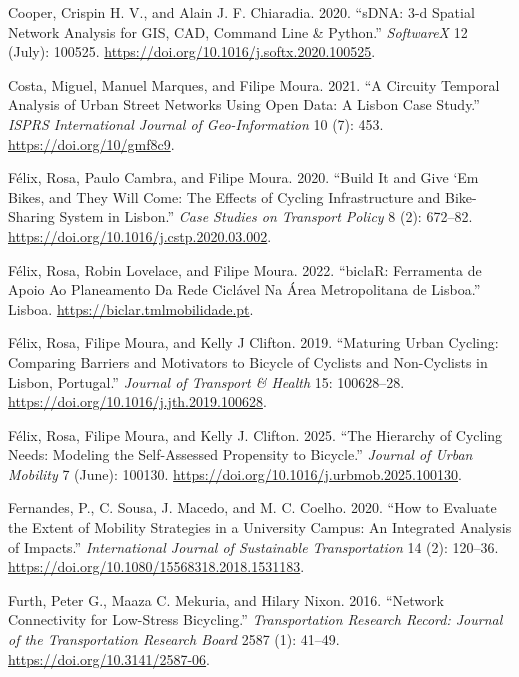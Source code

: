 \documentclass[
  sn-nature,
]{sn-jnl}
\newlength{\cslhangindent}
\newenvironment{CSLReferences}[2] %
 {\begin{list}{}{%
  \setlength{\itemindent}{0pt}
  \setlength{\leftmargin}{0pt}
  \setlength{\parsep}{0pt}
  \ifodd #1
   \setlength{\leftmargin}{\cslhangindent}
   \setlength{\itemindent}{-1\cslhangindent}
  \fi
  \setlength{\itemsep}{#2\baselineskip}}}
 {\end{list}}
\begin{document}
\begin{CSLReferences}{1}{0}
Cooper, Crispin H. V., and Alain J. F. Chiaradia. 2020. {``sDNA: 3-d
Spatial Network Analysis for GIS, CAD, Command Line \& Python.''}
\emph{SoftwareX} 12 (July): 100525.
\url{https://doi.org/10.1016/j.softx.2020.100525}.

Costa, Miguel, Manuel Marques, and Filipe Moura. 2021. {``A Circuity
Temporal Analysis of Urban Street Networks Using Open Data: A Lisbon
Case Study.''} \emph{ISPRS International Journal of Geo-Information} 10
(7): 453. \url{https://doi.org/10/gmf8c9}.

Félix, Rosa, Paulo Cambra, and Filipe Moura. 2020. {``Build It and Give
{`}Em Bikes, and They Will Come: The Effects of Cycling Infrastructure
and Bike-Sharing System in Lisbon.''} \emph{Case Studies on Transport
Policy} 8 (2): 672--82.
\url{https://doi.org/10.1016/j.cstp.2020.03.002}.

Félix, Rosa, Robin Lovelace, and Filipe Moura. 2022. {``biclaR:
Ferramenta de Apoio Ao Planeamento Da Rede Ciclável Na Área
Metropolitana de Lisboa.''} Lisboa.
\url{https://biclar.tmlmobilidade.pt}.

Félix, Rosa, Filipe Moura, and Kelly J Clifton. 2019. {``Maturing Urban
Cycling: Comparing Barriers and Motivators to Bicycle of Cyclists and
Non-Cyclists in Lisbon, Portugal.''} \emph{Journal of Transport \&
Health} 15: 100628--28. \url{https://doi.org/10.1016/j.jth.2019.100628}.

Félix, Rosa, Filipe Moura, and Kelly J. Clifton. 2025. {``The Hierarchy
of Cycling Needs: Modeling the Self-Assessed Propensity to Bicycle.''}
\emph{Journal of Urban Mobility} 7 (June): 100130.
\url{https://doi.org/10.1016/j.urbmob.2025.100130}.

Fernandes, P., C. Sousa, J. Macedo, and M. C. Coelho. 2020. {``How to
Evaluate the Extent of Mobility Strategies in a University Campus: An
Integrated Analysis of Impacts.''} \emph{International Journal of
Sustainable Transportation} 14 (2): 120--36.
\url{https://doi.org/10.1080/15568318.2018.1531183}.

Furth, Peter G., Maaza C. Mekuria, and Hilary Nixon. 2016. {``Network
Connectivity for Low-Stress Bicycling.''} \emph{Transportation Research
Record: Journal of the Transportation Research Board} 2587 (1): 41--49.
\url{https://doi.org/10.3141/2587-06}.


\end{CSLReferences}
\end{document}

